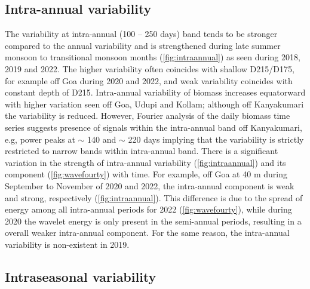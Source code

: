 \documentclass{article}
\begin{document}
	\subsection{Intra-annual variability}
	The variability at intra-annual (100 -- 250 days) band tends to be stronger compared to the annual variability and is strengthened during late summer monsoon to transitional monsoon months (\cref{fig:intraannual}) as seen during 2018, 2019 and 2022. The higher variability often coincides with shallow D215/D175, for example off Goa during 2020 and 2022, and weak variability coincides with constant depth of D215. Intra-annual variability of biomass increases equatorward with higher variation seen off Goa, Udupi and Kollam; although off Kanyakumari the variability is reduced. However, Fourier analysis of the daily biomass time series suggests presence of signals within the intra-annual band off Kanyakumari, e.g, power peaks at $\sim$ 140 and $\sim$ 220 days implying that the variability is strictly restricted to narrow bands within intra-annual band. There is a significant variation in the strength of intra-annual variability (\cref{fig:intraannual}) and its component (\cref{fig:wavefourty}) with time. For example, off Goa at 40 m during September to November of 2020 and 2022, the intra-annual component is weak and strong, respectively (\cref{fig:intraannual}). This difference is due to the spread of energy among all intra-annual periods for 2022 (\cref{fig:wavefourty}), while during 2020 the wavelet energy is only present in the semi-annual periods, resulting in a overall weaker intra-annual component. For the same reason, the intra-annual variability is non-existent in 2019.
	
	\subsection{Intraseasonal variability}
	
\end{document}
